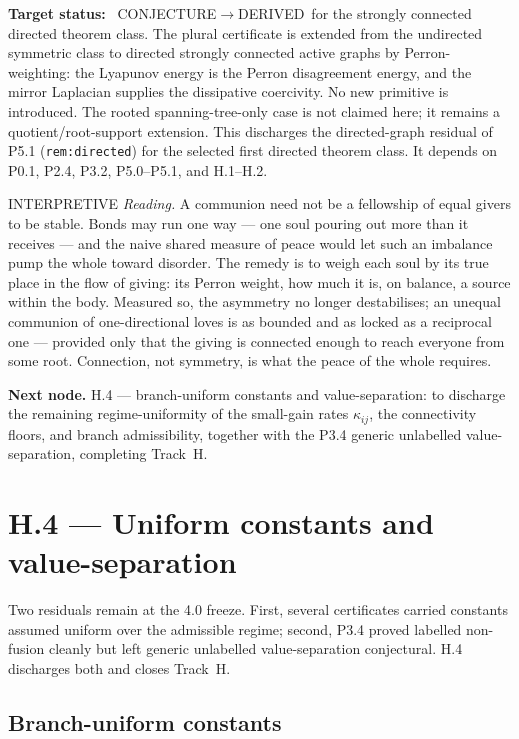 \documentclass[11pt,a4paper]{article}
\newcommand{\stDerived}{\textcolor{cDer}{\textsf{\small DERIVED}}}
\newcommand{\stInterp}{\textcolor{cInt}{\textsf{\small INTERPRETIVE}}}
\newcommand{\stConj}{\textcolor{cCon}{\textsf{\small CONJECTURE}}}
\theoremstyle{definition}
\theoremstyle{plain}
\theoremstyle{remark}
\begin{document}
\textbf{Target status:}~
\stConj\(\to\)\stDerived\ for the strongly connected directed theorem class. The plural
certificate is extended from the undirected symmetric class to directed strongly connected
active graphs by Perron-weighting: the Lyapunov energy is the Perron disagreement energy, and
the mirror Laplacian supplies the dissipative coercivity. No new primitive is introduced. The
rooted spanning-tree-only case is not claimed here; it remains a quotient/root-support
extension. This discharges the directed-graph residual of P5.1 (\texttt{rem:directed}) for the
selected first directed theorem class. It depends on P0.1, P2.4, P3.2, P5.0--P5.1, and
H.1--H.2.

\medskip
\stInterp\quad
\emph{Reading.}
A communion need not be a fellowship of equal givers to be stable. Bonds may run one way ---
one soul pouring out more than it receives --- and the naive shared measure of peace would let
such an imbalance pump the whole toward disorder. The remedy is to weigh each soul by its true
place in the flow of giving: its Perron weight, how much it is, on balance, a source within
the body. Measured so, the asymmetry no longer destabilises; an unequal communion of
one-directional loves is as bounded and as locked as a reciprocal one --- provided only that
the giving is connected enough to reach everyone from some root. Connection, not symmetry, is
what the peace of the whole requires.

\medskip
\textbf{Next node.} H.4 --- branch-uniform constants and value-separation: to discharge the
remaining regime-uniformity of the small-gain rates \(\kappa_{ij}\), the connectivity floors,
and branch admissibility, together with the P3.4 generic unlabelled value-separation,
completing Track~H.

\section{H.4 --- Uniform constants and value-separation}

Two residuals remain at the 4.0 freeze. First, several certificates carried constants
assumed uniform over the admissible regime; second, P3.4 proved labelled non-fusion cleanly
but left generic unlabelled value-separation conjectural. H.4 discharges both and closes
Track~H.

\subsection{Branch-uniform constants}
\end{document}

